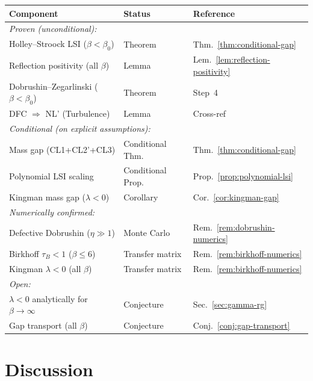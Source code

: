 \documentclass[12pt,a4paper]{article}
\theoremstyle{definition}
\theoremstyle{plain}
\theoremstyle{remark}
\begin{document}
\begin{center}
\begin{tabular}{|l|l|l|}
\hline
\textbf{Component} & \textbf{Status} & \textbf{Reference} \\
\hline
\hline
\multicolumn{3}{|l|}{\textit{Proven (unconditional):}} \\
\hline
Holley--Stroock LSI ($\beta < \beta_0$) & Theorem & Thm.~\ref{thm:conditional-gap} \\
Reflection positivity (all $\beta$) & Lemma & Lem.~\ref{lem:reflection-positivity} \\
Dobrushin--Zegarlinski ($\beta < \beta_0$) & Theorem & Step~4 \\
DFC $\Rightarrow$ NL' (Turbulence) & Lemma & Cross-ref \\
\hline
\multicolumn{3}{|l|}{\textit{Conditional (on explicit assumptions):}} \\
\hline
Mass gap (CL1+CL2'+CL3) & Conditional Thm. & Thm.~\ref{thm:conditional-gap} \\
Polynomial LSI scaling & Conditional Prop. & Prop.~\ref{prop:polynomial-lsi} \\
Kingman mass gap ($\lambda < 0$) & Corollary & Cor.~\ref{cor:kingman-gap} \\
\hline
\multicolumn{3}{|l|}{\textit{Numerically confirmed:}} \\
\hline
Defective Dobrushin ($\eta \gg 1$) & Monte Carlo & Rem.~\ref{rem:dobrushin-numerics} \\
Birkhoff $\tau_B < 1$ ($\beta \leq 6$) & Transfer matrix & Rem.~\ref{rem:birkhoff-numerics} \\
Kingman $\lambda < 0$ (all $\beta$) & Transfer matrix & Rem.~\ref{rem:birkhoff-numerics} \\
\hline
\multicolumn{3}{|l|}{\textit{Open:}} \\
\hline
$\lambda < 0$ analytically for $\beta \to \infty$ & Conjecture & Sec.~\ref{sec:gamma-rg} \\
Gap transport (all $\beta$) & Conjecture & Conj.~\ref{conj:gap-transport} \\
\hline
\end{tabular}
\end{center}

\section{Discussion}
\end{document}
